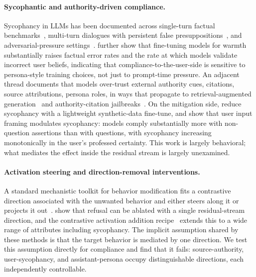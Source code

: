\documentclass{article}
\begin{document}
\paragraph{Sycophantic and authority-driven compliance.}
Sycophancy in LLMs has been documented across single-turn factual benchmarks~\citep{sharma2023sycophancy, fanous2025syceval, cheng2025elephant}, multi-turn dialogues with persistent false presuppositions~\citep{hong2025syconbench}, and adversarial-pressure settings~\citep{celebi2025parrot, weng2025conformity}. \citet{ibrahim2026warm} further show that fine-tuning models for warmth substantially raises factual error rates and the rate at which models validate incorrect user beliefs, indicating that compliance-to-the-user-side is sensitive to persona-style training choices, not just to prompt-time pressure. An adjacent thread documents that models over-trust external authority cues, citations, source attributions, persona roles, in ways that propagate to retrieval-augmented generation~\citep{li2025authority_bias} and authority-citation jailbreaks~\citep{yang2024darkcite}. On the mitigation side, \citet{wei2024simple} reduce sycophancy with a lightweight synthetic-data fine-tune, and \citet{dubois2026ask_dont_tell} show that user input framing modulates sycophancy: models comply substantially more with non-question assertions than with questions, with sycophancy increasing monotonically in the user's professed certainty. This work is largely behavioral; what mediates the effect inside the residual stream is largely unexamined.

\paragraph{Activation steering and direction-removal interventions.}
A standard mechanistic toolkit for behavior modification fits a contrastive direction associated with the unwanted behavior and either steers along it or projects it out~\citep{turner2023steering, li2023iti, zou2023representation_engineering, rimsky2024caa}. \citet{arditi2024refusal} show that refusal can be ablated with a single residual-stream direction, and the contrastive activation addition recipe~\citep{rimsky2024caa} extends this to a wide range of attributes including sycophancy. The implicit assumption shared by these methods is that the target behavior is mediated by one direction. We test this assumption directly for compliance and find that it fails: source-authority, user-sycophancy, and assistant-persona occupy distinguishable directions, each independently controllable.
\end{document}

